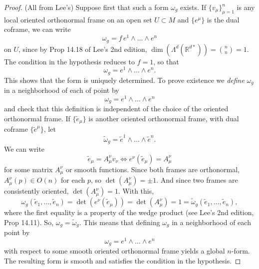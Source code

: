 \documentclass{article}
\theoremstyle{definition}
\renewcommand\det{\operatorname{det}}
\newcommand{\R}{\mathbb{R}}
\theoremstyle{theorem}
\begin{document}
\begin{proof} (All from Lee's)
Suppose first that such a form $\omega_g$ exists. If $\{ v_\mu \}_{\mu = 1}^n$ is any local oriented orthonormal frame on an open set $U\subset M$ and $\{ e^\mu \}$ is the dual coframe, we can write 
\begin{equation*}
    \omega_g = f\, e^1 \land \dots \land e^n
\end{equation*}
on $U$, since by Prop 14.18 of Lee's 2nd edition, $\dim(\Lambda^d(\R^{d*}))= {n \choose{n}} = 1$. The condition in the hypothesis reduces to $f = 1$, so that
\begin{equation*}
    \omega_g = e^1 \land \dots \land e^n.
\end{equation*}
This shows that the form is uniquely determined. To prove existence we \textit{define} $\omega_g$ in a neighborhood of each of point by 
\begin{equation*}
    \omega_g = e^1 \land \dots \land e^n
\end{equation*}
and check that this definition is independent of the choice of the oriented orthonormal frame. If $\{ \tilde{e}_\mu \}$ is another oriented orthonormal frame, with dual coframe $\{ \tilde{e}^\mu \}$, let
\begin{equation*}
    \tilde{\omega}_g = \tilde{e}^1 \land \dots \land \tilde{e}^n.
\end{equation*}
We can write
\begin{equation*}
    \tilde{e}_\mu = A^\nu_\mu v_\nu \iff e^\nu(\tilde{e}_\mu) = A^\nu_\mu
\end{equation*}
for some matrix $A^\nu_\mu$ or smooth functions. Since both frames are orthonormal, $A^\nu_\mu(p)\in O(n)$ for each $p$, so $\det(A^\nu_\mu) = \pm 1$. And since two frames are consistently oriented, $\det(A^\nu_\mu) = 1$. With this, 
\begin{equation*}
    \omega_g(\tilde{e}_1,\dots,\tilde{e}_n) = \det(e^\nu(\tilde{e}_\mu) ) = \det(A^\nu_\mu) = 1 = \tilde{\omega}_g(\tilde{e}_1,\dots,\tilde{e}_n),
\end{equation*}
where the first equality is a property of the wedge product (see Lee's 2nd edition, Prop 14.11). So, $\omega_g = \tilde{\omega}_g$. This means that defining $\omega_g$ in a neighborhood of each point by 
\begin{equation*}
    \omega_g = e^1 \land \dots \land e^n
\end{equation*}
with respect to some smooth oriented orthonormal frame yields a global $n$-form. The resulting form is smooth and satisfies the condition in the hypothesis. 
\end{proof}
\end{document}
